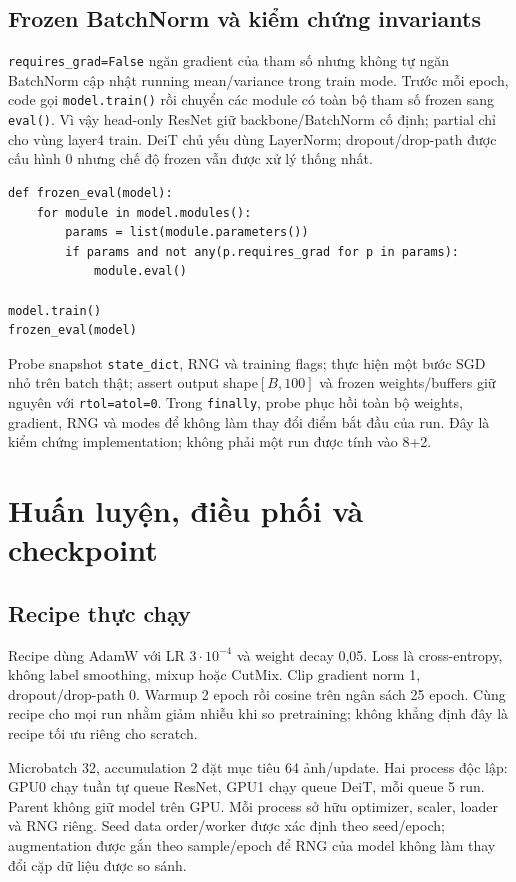 \documentclass[11pt,a4paper]{article}
\begin{document}
\subsection{Frozen BatchNorm và kiểm chứng invariants}
\texttt{requires\_grad=False} ngăn gradient của tham số nhưng không tự ngăn BatchNorm cập nhật running mean/variance trong train mode. Trước mỗi epoch, code gọi \texttt{model.train()} rồi chuyển các module có toàn bộ tham số frozen sang \texttt{eval()}. Vì vậy head-only ResNet giữ backbone/BatchNorm cố định; partial chỉ cho vùng layer4 train. DeiT chủ yếu dùng LayerNorm; dropout/drop-path được cấu hình 0 nhưng chế độ frozen vẫn được xử lý thống nhất.
\begin{lstlisting}
def frozen_eval(model):
    for module in model.modules():
        params = list(module.parameters())
        if params and not any(p.requires_grad for p in params):
            module.eval()

model.train()
frozen_eval(model)
\end{lstlisting}
Probe snapshot \texttt{state\_dict}, RNG và training flags; thực hiện một bước SGD nhỏ trên batch thật; assert output shape$[B,100]$ và frozen weights/buffers giữ nguyên với \texttt{rtol=atol=0}. Trong \texttt{finally}, probe phục hồi toàn bộ weights, gradient, RNG và modes để không làm thay đổi điểm bắt đầu của run. Đây là kiểm chứng implementation; không phải một run được tính vào 8+2.

\section{Huấn luyện, điều phối và checkpoint}\label{sec:train}
\subsection{Recipe thực chạy}
Recipe dùng AdamW với LR $3\cdot 10^{-4}$ và weight decay 0,05. Loss là cross-entropy, không label smoothing, mixup hoặc CutMix. Clip gradient norm 1, dropout/drop-path 0. Warmup 2 epoch rồi cosine trên ngân sách 25 epoch. Cùng recipe cho mọi run nhằm giảm nhiễu khi so pretraining; không khẳng định đây là recipe tối ưu riêng cho scratch.

Microbatch 32, accumulation 2 đặt mục tiêu 64 ảnh/update. Hai process độc lập: GPU0 chạy tuần tự queue ResNet, GPU1 chạy queue DeiT, mỗi queue 5 run. Parent không giữ model trên GPU. Mỗi process sở hữu optimizer, scaler, loader và RNG riêng. Seed data order/worker được xác định theo seed/epoch; augmentation được gắn theo sample/epoch để RNG của model không làm thay đổi cặp dữ liệu được so sánh.
\clearpage
\end{document}
